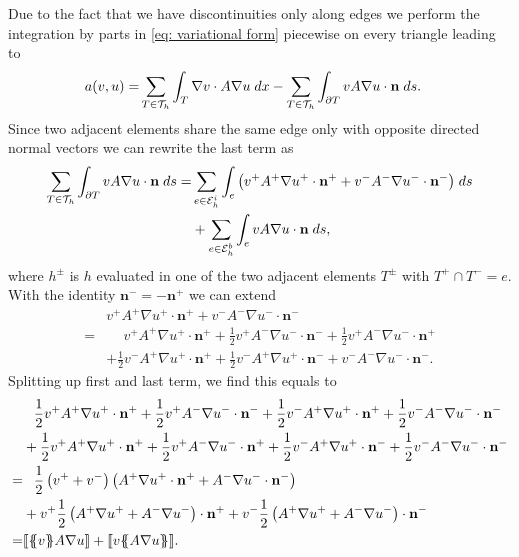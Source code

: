 Due to the fact that we have discontinuities only along edges we perform the integration by parts in \eqref{eq: variational form} piecewise on every triangle leading to
\begin{align}
	a(v, u) = & \sum_{T \in \mathcal{T}_h} \int_{T} {{\nabla v \cdot A \nabla u }\;dx}
		- \sum_{T \in \mathcal{T}_h} \int_{\partial T} {{ v A \nabla u \cdot \mathbf n}\;ds}.
\end{align}
Since two adjacent elements share the same edge only with opposite directed normal vectors we can rewrite the last term as
\begin{align*}
\sum\limits_{T \in \mathcal{T}_h}\int_{\partial T} {{ v A \nabla u \cdot \mathbf n }\;ds}
= &\sum\limits_{e \in \mathcal{E}_h^i}\int_{e} {{ \left( v^+ A^+ \nabla u^+ \cdot \mathbf n^+ + v^- A^- \nabla u^- \cdot \mathbf n^- \right)}\;ds} \\
& + \sum\limits_{e \in \mathcal{E}_h^b}\int_{e} {{ v A \nabla u \cdot \mathbf n}\;ds},
\end{align*}
where $h^\pm $ is $h$ evaluated in one of the two adjacent elements $T^\pm$ with $T^+ \cap T^- = e$. With the identity $\mathbf n^- = -\mathbf n^+$ we can extend
\begin{align*}
	&v^+ A^+ \nabla u^+ \cdot \mathbf n^+ + v^- A^- \nabla u^- \cdot \mathbf n^- \\
		= & \phantom{+} v^+ A^+ \nabla u^+ \cdot \mathbf n^+ 
		     + \frac 1 2  v^+ A^- \nabla u^- \cdot \mathbf n^- + \frac 1 2 v^+ A^- \nabla u^- \cdot \mathbf n^+ \\
		& + \frac 1 2  v^- A^+ \nabla u^+ \cdot \mathbf n^+ + \frac 1 2 v^- A^+ \nabla u^+ \cdot \mathbf n^-
		   + v^- A^- \nabla u^- \cdot \mathbf n^-.
\end{align*}
Splitting up first and last term, we find this equals to
\begin{align*}
		 & \phantom{+} \frac 1 2 v^+ A^+ \nabla u^+ \cdot \mathbf n^+ 
		     + \frac 1 2  v^+ A^- \nabla u^- \cdot \mathbf n^- + \frac 1 2  v^- A^+ \nabla u^+ \cdot \mathbf n^+ + \frac 1 2 v^- A^- \nabla u^- \cdot \mathbf n^- \\
		& + \frac 1 2  v^+ A^+ \nabla u^+ \cdot \mathbf n^+  + \frac 1 2 v^+ A^- \nabla u^- \cdot \mathbf n^+ +\frac 1 2 v^- A^+ \nabla u^+ \cdot \mathbf n^- + \frac 1 2 v^- A^- \nabla u^- \cdot \mathbf n^-\\
		    	  = & \phantom{+} \frac 1 2 \left(v^+ + v^- \right) \left(A^+ \nabla u^+ \cdot \mathbf n^+ + A^- \nabla u^- \cdot \mathbf n^- \right) \\
  &+  v^+ \frac 1 2  \left(A^+ \nabla u^+ + A^- \nabla u^-\right) \cdot \mathbf n^+ + v^- \frac 1 2 \left(A^+ \nabla u^+ + A^- \nabla u^-\right) \cdot \mathbf n^- \\
  = &  \jump {\average v  A \nabla u}+ \jump {v \average{ A \nabla u}}.
\end{align*}
